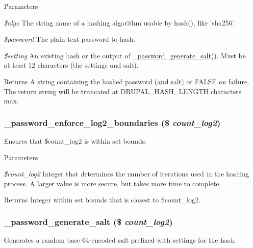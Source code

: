 \begin{DoxyParams}{Parameters}
\item[{\em \$algo}]The string name of a hashing algorithm usable by hash(), like 'sha256'. \item[{\em \$password}]The plain-\/text password to hash. \item[{\em \$setting}]An existing hash or the output of \hyperlink{password_8inc_a0ebe31e5a38758a91dfd23d98f2b719a}{\_\-password\_\-generate\_\-salt()}. Must be at least 12 characters (the settings and salt).\end{DoxyParams}
\begin{DoxyReturn}{Returns}
A string containing the hashed password (and salt) or FALSE on failure. The return string will be truncated at DRUPAL\_\-HASH\_\-LENGTH characters max. 
\end{DoxyReturn}
\hypertarget{password_8inc_a65b1a9f521b456c95ec8f8542bd5f59b}{
\subsubsection[{\_\-password\_\-enforce\_\-log2\_\-boundaries}]{\setlength{\rightskip}{0pt plus 5cm}\_\-password\_\-enforce\_\-log2\_\-boundaries (\$ {\em count\_\-log2})}}
\label{password_8inc_a65b1a9f521b456c95ec8f8542bd5f59b}
Ensures that \$count\_\-log2 is within set bounds.


\begin{DoxyParams}{Parameters}
\item[{\em \$count\_\-log2}]Integer that determines the number of iterations used in the hashing process. A larger value is more secure, but takes more time to complete.\end{DoxyParams}
\begin{DoxyReturn}{Returns}
Integer within set bounds that is closest to \$count\_\-log2. 
\end{DoxyReturn}
\hypertarget{password_8inc_a0ebe31e5a38758a91dfd23d98f2b719a}{
\subsubsection[{\_\-password\_\-generate\_\-salt}]{\setlength{\rightskip}{0pt plus 5cm}\_\-password\_\-generate\_\-salt (\$ {\em count\_\-log2})}}
\label{password_8inc_a0ebe31e5a38758a91dfd23d98f2b719a}
Generates a random base 64-\/encoded salt prefixed with settings for the hash.

